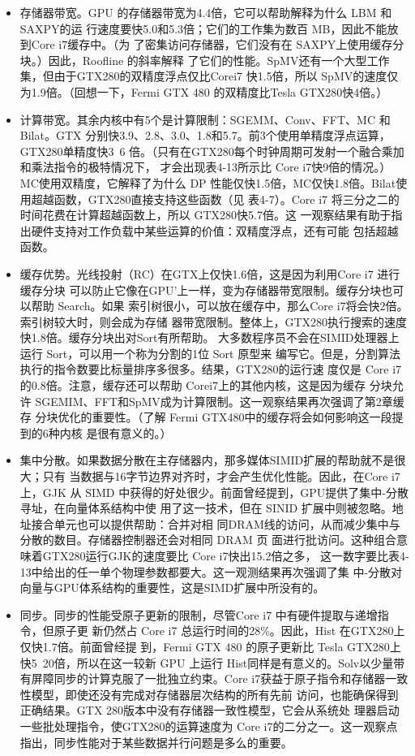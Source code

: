 \begin{itemize}
    \item 存储器带宽。GPU 的存储器带宽为4.4倍，它可以帮助解释为什么 LBM 和 SAXPY的运
    行速度要快5.0和5.3倍；它们的工作集为数百 MB，因此不能放到Core i7缓存中。（为
    了密集访问存储器，它们没有在 SAXPY上使用缓存分块。）因此，Roofline 的斜率解释
    了它们的性能。SpMV还有一个大型工作集，但由于GTX280的双精度浮点仅比Corei7
    快1.5倍，所以 SpMV的速度仅为1.9倍。（回想一下，Fermi GTX 480 的双精度比Tesla
    GTX280快4倍。）
    \item 计算带宽。其余内核中有5个是计算限制：SGEMM、Conv、FFT、MC 和 Bilat。GTX
    分别快3.9、2.8、3.0、1.8和5.7。前3个使用单精度浮点运算，GTX280单精度快3~6
    倍。（只有在GTX280每个时钟周期可发射一个融合乘加和乘法指令的极特情况下，
    才会出现表4-13所示比 Core i7快9倍的情况。）MC使用双精度，它解释了为什么 DP
    性能仅快1.5倍，MC仅快1.8倍。Bilat使用超越函数，GTX280直接支持这些函数（见
    表4-7）。Core i7 将三分之二的时间花费在计算超越函数上，所以 GTX280快5.7倍。这
    一观察结果有助于指出硬件支持对工作负载中某些运算的价值：双精度浮点，还有可能
    包括超越函数。
    \item 缓存优势。光线投射（RC）在GTX上仅快1.6倍，这是因为利用Core i7 进行缓存分块
    可以防止它像在GPU’上一样，变为存储器带宽限制。缓存分块也可以帮助 Search。如果
    索引树很小，可以放在缓存中，那么Core i7将会快2倍。索引树较大时，则会成为存储
    器带宽限制。整体上，GTX280执行搜索的速度快1.8倍。缓存分块出对Sort有所帮助。
    大多数程序员不会在SIMID处理器上运行 Sort，可以用一个称为分割的1位 Sort 原型来
    编写它。但是，分割算法执行的指令数要比标量排序多很多。结果，GTX280的运行速
    度仅是 Core i7的0.8倍。注意，缓存还可以帮助 Corei7上的其他内核，这是因为缓存
    分块允许 SGEMIM、FFT和SpMV成为计算限制。这一观察结果再次强调了第2章缓存
    分块优化的重要性。（了解 Fermi GTX480中的缓存将会如何影响这一段提到的6种内核
    是很有意义的。）
    \item 集中分散。如果数据分散在主存储器内，那多媒体SIMID扩展的帮助就不是很大；只有
    当数据与16字节边界对齐时，才会产生优化性能。因此，在Core i7上，GJK 从 SIMD
    中获得的好处很少。前面曾经提到，GPU提供了集中-分散寻址，在向量体系结构中使
    用了这一技术，但在 SINID 扩展中则被忽略。地址接合单元也可以提供帮助：合并对相
    同DRAM线的访问，从而减少集中与分散的数目。存储器控制器还会对相同 DRAM 页
    面进行批访问。这种组合意味着GTX280运行GJK的速度要比 Core i7快出15.2倍之多，
    这一数字要比表4-13中给出的任一单个物理参数都要大。这一观测结果再次强调了集
    中-分散对向量与GPU体系结构的重要性，这是SIMD扩展中所没有的。
    \item 同步。同步的性能受原子更新的限制，尽管Core i7 中有硬件提取与递增指令，但原子更
    新仍然占 Core i7 总运行时间的28\%。因此，Hist 在GTX280上仅快1.7倍。前面曾经提
    到，Fermi GTX 480 的原子更新比 Tesla GTX280上快5~20倍，所以在这一较新 GPU
    上运行 Hist同样是有意义的。Solv以少量带有屏障同步的计算克服了一批独立约束。Core
    i7获益于原子指令和存储器一致性模型，即使还没有完成对存储器层次结构的所有先前
    访问，也能确保得到正确结果。GTX 280版本中没有存储器一致性模型，它会从系统处
    理器启动一些批处理指令，使GTX280的运算速度为 Core i7的二分之一。这一观察点
    指出，同步性能对于某些数据并行问题是多么的重要。
\end{itemize}

